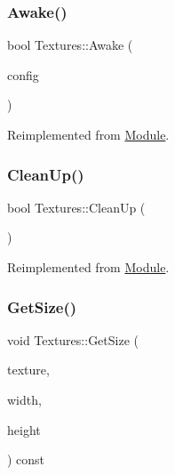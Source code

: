 \subsubsection{\texorpdfstring{Awake()}{Awake()}}
{\footnotesize\ttfamily bool Textures\+::\+Awake (\begin{DoxyParamCaption}\item[{pugi\+::xml\+\_\+node \&}]{config }\end{DoxyParamCaption})\hspace{0.3cm}{\ttfamily [virtual]}}



Reimplemented from \mbox{\hyperlink{class_module_a4a283650cf8a73aa0b5599106bc2ba6c}{Module}}.

\mbox{\label{class_textures_ae1e354e40c2ead6427152e70b92ad43e}} 
\subsubsection{\texorpdfstring{CleanUp()}{CleanUp()}}
{\footnotesize\ttfamily bool Textures\+::\+Clean\+Up (\begin{DoxyParamCaption}{ }\end{DoxyParamCaption})\hspace{0.3cm}{\ttfamily [virtual]}}



Reimplemented from \mbox{\hyperlink{class_module_a77d7a006e42c0bd10110e1adbd4598cb}{Module}}.

\mbox{\label{class_textures_a3cac54c5bd4925d4527860ca0a816dab}} 
\subsubsection{\texorpdfstring{GetSize()}{GetSize()}}
{\footnotesize\ttfamily void Textures\+::\+Get\+Size (\begin{DoxyParamCaption}\item[{const S\+D\+L\+\_\+\+Texture $\ast$}]{texture,  }\item[{\mbox{\hyperlink{_defs_8h_a91ad9478d81a7aaf2593e8d9c3d06a14}{uint}} \&}]{width,  }\item[{\mbox{\hyperlink{_defs_8h_a91ad9478d81a7aaf2593e8d9c3d06a14}{uint}} \&}]{height }\end{DoxyParamCaption}) const}

